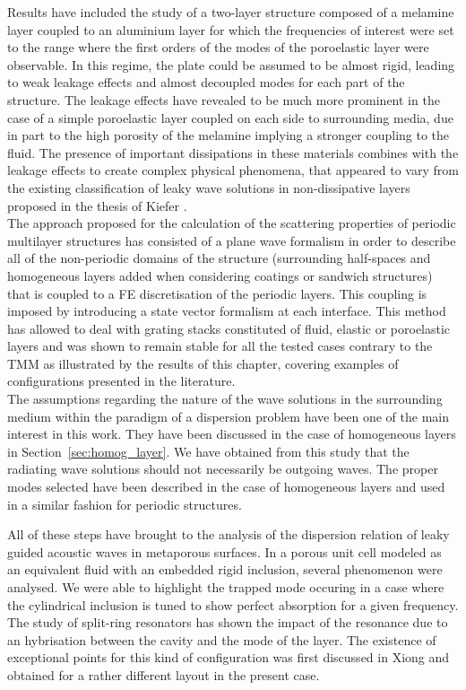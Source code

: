 Results have included the study of a two-layer structure composed of a melamine layer coupled to an aluminium layer for which the frequencies of interest were set to the range where the first orders of the modes of the poroelastic layer were observable. In this regime, the plate could be {assumed to be almost rigid}, leading to weak leakage effects and almost decoupled modes for each part of the structure. The leakage effects have revealed to be much more prominent in the case of a simple poroelastic layer coupled on each side to surrounding media, due in part to the high porosity of the melamine implying a stronger coupling to the fluid. The presence of {important dissipations} in these materials combines with the leakage effects to create complex physical phenomena, that appeared to {vary from the existing classification of leaky wave solutions} in non-dissipative layers proposed in the thesis of Kiefer \cite{kiefer2022}. \\

The approach proposed for the calculation of the {scattering properties of periodic multilayer structures} has consisted of a {plane wave formalism} in order to describe all of the non-periodic domains of the structure (surrounding half-spaces and homogeneous layers added when considering coatings or sandwich structures) that is {coupled to a FE discretisation} of the periodic layers. This coupling is imposed by introducing a {state vector formalism} at each interface. This method has allowed to deal with grating stacks constituted of fluid, elastic or poroelastic layers and was shown to {remain stable} for all the tested cases contrary to the TMM as illustrated by the results of this chapter, covering examples of configurations presented in the literature.\\

The assumptions regarding the nature of the {wave solutions in the surrounding medium} within the paradigm of a dispersion problem have been one of the main interest in this work. They have been discussed in the case of homogeneous layers in Section~\ref{sec:homog_layer}. We have obtained from this study that the radiating wave solutions {should not necessarily be outgoing waves}. The proper modes selected have been described in the case of homogeneous layers and used in a similar fashion for periodic structures.

All of these steps have brought to the analysis of the dispersion relation of leaky guided acoustic waves in metaporous surfaces. In a porous unit cell modeled as an equivalent fluid with an embedded rigid inclusion, several phenomenon were analysed. We were able to highlight the {trapped mode} occuring in a case where the cylindrical inclusion is tuned to show {perfect absorption} for a given frequency. The study of split-ring resonators has shown the impact of the resonance due to an {hybrisation between the cavity and the mode of the layer}. The existence of {exceptional points} for this kind of configuration was first discussed in Xiong \etal\cite{xiong2017} and obtained for a rather different layout in the present case. \\

